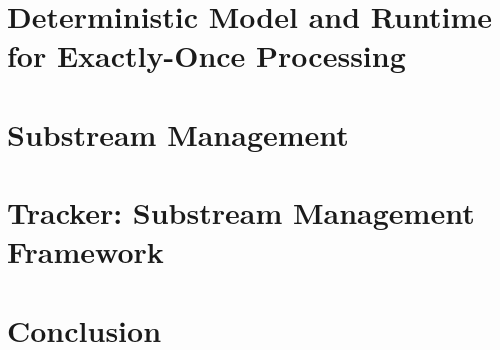 \documentclass[a4paper, 12pt, oneside]{Thesis}  %
\theoremstyle{definition}
\begin{document}
\chapter{Deterministic Model and Runtime for Exactly-Once Processing}
\label{thesis-chapther-optimistic}


\chapter{Substream Management}
\label{thesis-chapter-substreams-consistency}


\chapter{Tracker: Substream Management Framework}
\label{thesis-chapter-tracker}


\chapter{Conclusion}
\label{thesis-chapter-conclusion}










\appendix %




\backmatter

\label{references}
\end{document}
